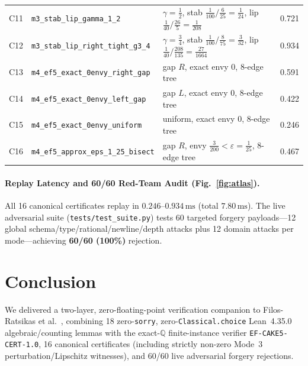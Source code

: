 \documentclass[10pt,twocolumn]{article}
\newcommand{\QQ}{\mathbb{Q}}
\begin{document}
\begin{table}[t]
{\begin{tabular}{@{}lllr@{}}
C11 & \texttt{m3\_stab\_lip\_gamma\_1\_2} & $\gamma{=}\frac{1}{2}$, stab $\frac{1}{100}/\frac{6}{25}{=}\frac{1}{24}$, lip $\frac{1}{40}/\frac{26}{5}{=}\frac{1}{208}$ & 0.721 \\
C12 & \texttt{m3\_stab\_lip\_right\_tight\_g3\_4} & $\gamma{=}\frac{3}{4}$, stab $\frac{1}{100}/\frac{8}{75}{=}\frac{3}{32}$, lip $\frac{1}{40}/\frac{208}{135}{=}\frac{27}{1664}$ & 0.934 \\
C13 & \texttt{m4\_ef5\_exact\_0envy\_right\_gap} & gap $R$, exact envy $0$, 8-edge tree & 0.591 \\
C14 & \texttt{m4\_ef5\_exact\_0envy\_left\_gap} & gap $L$, exact envy $0$, 8-edge tree & 0.422 \\
C15 & \texttt{m4\_ef5\_exact\_0envy\_uniform} & uniform, exact envy $0$, 8-edge tree & 0.246 \\
C16 & \texttt{m4\_ef5\_approx\_eps\_1\_25\_bisect} & gap $R$, envy $\frac{3}{200} < \varepsilon{=}\frac{1}{25}$, 8-edge tree & 0.467 \\
\bottomrule
\end{tabular}}
\end{table}

\paragraph{Replay Latency and 60/60 Red-Team Audit (Fig.~\ref{fig:atlas}).}
All 16 canonical certificates replay in $0.246$--$0.934\,\mathrm{ms}$ (total $7.80\,\mathrm{ms}$). The live adversarial suite (\texttt{tests/test\_suite.py}) tests 60 targeted forgery payloads---12 global schema/type/rational/newline/depth attacks plus 12 domain attacks per mode---achieving \textbf{60/60 (100\%)} rejection.

\section{Conclusion}\label{sec:conc}
We delivered a two-layer, zero-floating-point verification companion to Filos-Ratsikas et al.~\cite{filosratsikas2026envyfree5}, combining 18 zero-\texttt{sorry}, zero-\texttt{Classical.choice} Lean~4.35.0 algebraic/counting lemmas with the exact-$\QQ$ finite-instance verifier \texttt{EF-CAKE5-CERT-1.0}, 16 canonical certificates (including strictly non-zero Mode~3 perturbation/Lipschitz witnesses), and 60/60 live adversarial forgery rejections.



\end{document}
